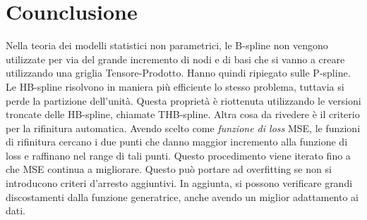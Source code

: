 \documentclass[../main.tex]{subfiles}
\begin{document}
\section{Counclusione}
Nella teoria dei modelli statistici non parametrici, le B-spline non vengono utilizzate per via del grande incremento di nodi e di basi 
che si vanno a creare utilizzando una griglia Tensore-Prodotto. Hanno quindi ripiegato sulle P-spline. Le HB-spline risolvono in maniera 
più efficiente lo stesso problema, tuttavia si perde la partizione dell'unità. Questa proprietà è riottenuta utilizzando le versioni troncate delle HB-spline, 
chiamate THB-spline. Altra cosa da rivedere è il criterio per la rifinitura automatica. Avendo scelto come \textit{funzione di loss} 
MSE, le funzioni di rifinitura cercano i due punti che danno maggior incremento alla funzione di loss e raffinano nel range di tali punti. 
Questo procedimento viene iterato fino a che MSE continua a migliorare. Questo può portare ad overfitting se non si introducono criteri d'arresto aggiuntivi.
In aggiunta, si possono verificare grandi discostamenti dalla funzione generatrice, anche avendo un miglior adattamento ai dati.
\end{document}

